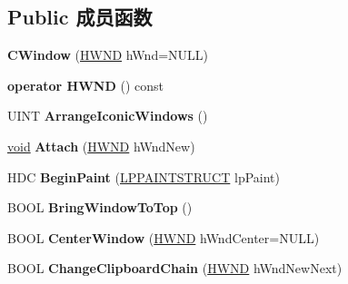 \subsection*{Public 成员函数}
\begin{DoxyCompactItemize}
\item 
\mbox{\label{class_a_t_l_1_1_c_window_a13747e7d511c292740969a962195b34f}} 
{\bfseries C\+Window} (\hyperlink{interfacevoid}{H\+W\+ND} h\+Wnd=N\+U\+LL)
\item 
\mbox{\label{class_a_t_l_1_1_c_window_accb8b06c50aea0f239b0aa1fd7cfc6d4}} 
{\bfseries operator H\+W\+ND} () const
\item 
\mbox{\label{class_a_t_l_1_1_c_window_ab0b5120114b43a92a5685618f8940fc0}} 
U\+I\+NT {\bfseries Arrange\+Iconic\+Windows} ()
\item 
\mbox{\label{class_a_t_l_1_1_c_window_ad8ad0a69c47d151fc1fe17da3de45cfd}} 
\hyperlink{interfacevoid}{void} {\bfseries Attach} (\hyperlink{interfacevoid}{H\+W\+ND} h\+Wnd\+New)
\item 
\mbox{\label{class_a_t_l_1_1_c_window_a8c9acddbc8f352995ae32581c9f87311}} 
H\+DC {\bfseries Begin\+Paint} (\hyperlink{structtag_p_a_i_n_t_s_t_r_u_c_t}{L\+P\+P\+A\+I\+N\+T\+S\+T\+R\+U\+CT} lp\+Paint)
\item 
\mbox{\label{class_a_t_l_1_1_c_window_a3f2f9471ce1e5ac71c396bc1e24e88dc}} 
B\+O\+OL {\bfseries Bring\+Window\+To\+Top} ()
\item 
\mbox{\label{class_a_t_l_1_1_c_window_a3fd0fa768823680113acc79ee97d9581}} 
B\+O\+OL {\bfseries Center\+Window} (\hyperlink{interfacevoid}{H\+W\+ND} h\+Wnd\+Center=N\+U\+LL)
\item 
\mbox{\label{class_a_t_l_1_1_c_window_a73c1d58c0729ceb12f4522bdcea5f009}} 
B\+O\+OL {\bfseries Change\+Clipboard\+Chain} (\hyperlink{interfacevoid}{H\+W\+ND} h\+Wnd\+New\+Next)
\item 
\mbox{\label{class_a_t_l_1_1_c_window_a28912dbef7d615bf93a1449801f83702}} 

\end{DoxyCompactItemize}
